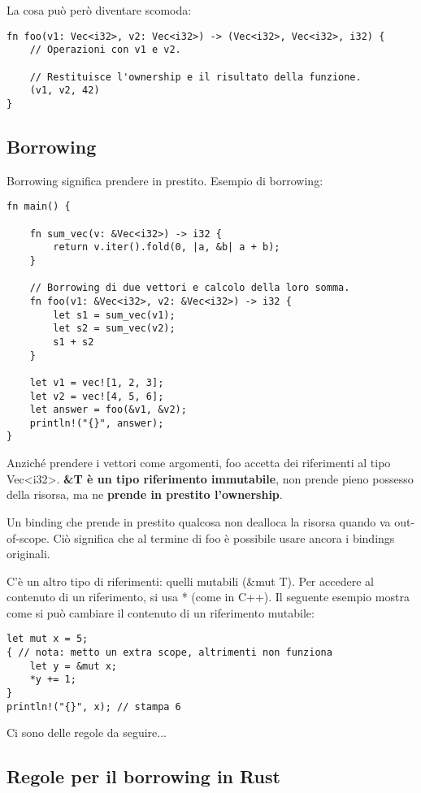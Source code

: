 La cosa può però diventare scomoda:

\begin{lstlisting}
fn foo(v1: Vec<i32>, v2: Vec<i32>) -> (Vec<i32>, Vec<i32>, i32) {
    // Operazioni con v1 e v2.

    // Restituisce l'ownership e il risultato della funzione.
    (v1, v2, 42)
}
\end{lstlisting}

\subsection{Borrowing}

Borrowing significa prendere in prestito. Esempio di borrowing:

\begin{lstlisting}
fn main() {

    fn sum_vec(v: &Vec<i32>) -> i32 {
        return v.iter().fold(0, |a, &b| a + b);
    }

    // Borrowing di due vettori e calcolo della loro somma.
    fn foo(v1: &Vec<i32>, v2: &Vec<i32>) -> i32 {
        let s1 = sum_vec(v1);
        let s2 = sum_vec(v2);
        s1 + s2
    }

    let v1 = vec![1, 2, 3];
    let v2 = vec![4, 5, 6];
    let answer = foo(&v1, &v2);
    println!("{}", answer);
}
\end{lstlisting}

Anziché prendere i vettori come argomenti, foo accetta dei riferimenti al tipo
Vec<i32>.
\textbf{ \&T è un tipo riferimento immutabile}, non prende pieno possesso della
risorsa, ma ne \textbf{prende in prestito l'ownership}.

Un binding che prende in prestito qualcosa non dealloca la risorsa quando va
out-of-scope. Ciò significa che al termine di foo è possibile usare ancora i
bindings originali.

C’è un altro tipo di riferimenti: quelli mutabili (\&mut T).
Per accedere al contenuto di un riferimento, si usa * (come in C++).
Il seguente esempio mostra come si può cambiare il contenuto di un riferimento
mutabile:

\begin{lstlisting}
let mut x = 5;
{ // nota: metto un extra scope, altrimenti non funziona
    let y = &mut x;
    *y += 1;
}
println!("{}", x); // stampa 6
\end{lstlisting}

Ci sono delle regole da seguire...

\subsection{Regole per il borrowing in Rust}

